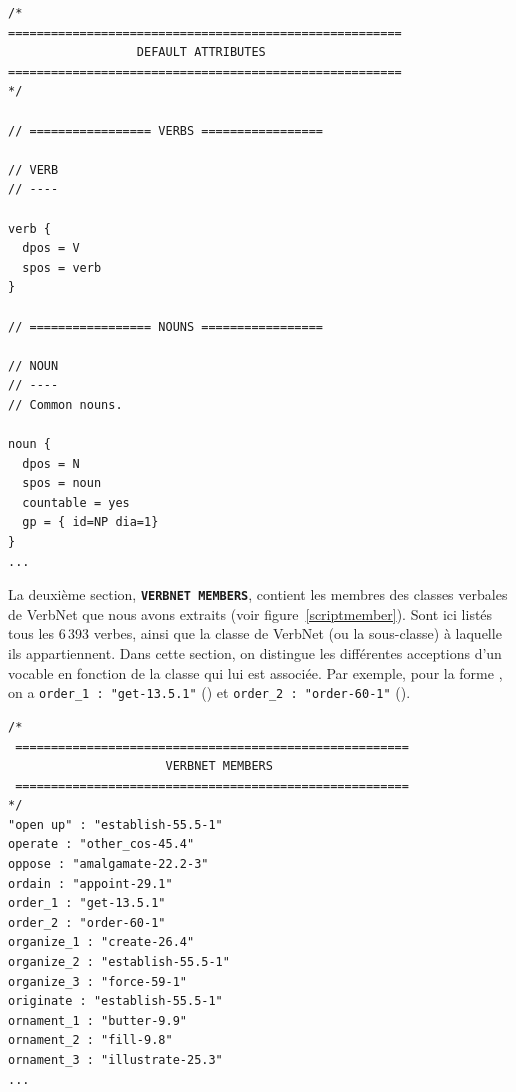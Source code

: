 
\begin{lstlisting}[language=mate, caption = Extrait du \emph{lexicon}: attributs par défaut des classes génériques, label=classedef]
/*
=======================================================
                  DEFAULT ATTRIBUTES
=======================================================
*/

// ================= VERBS =================

// VERB
// ----

verb {
  dpos = V
  spos = verb
}

// ================= NOUNS =================

// NOUN
// ----
// Common nouns.

noun {
  dpos = N
  spos = noun
  countable = yes
  gp = { id=NP dia=1}
}
...
\end{lstlisting}

La deuxième section, \textbf{\texttt{VERBNET MEMBERS}}, contient les membres des classes verbales de VerbNet que nous avons extraits (voir figure~\ref{scriptmember}). Sont ici listés tous les 6\,393 verbes, ainsi que la classe de VerbNet (ou la sous-classe) à laquelle ils appartiennent. Dans cette section, on distingue les différentes acceptions d'un vocable en fonction de la classe qui lui est associée. Par exemple, pour la forme , on a \texttt{order\_1 : "get-13.5.1"} () et \texttt{order\_2 : "order-60-1"} ().

\begin{lstlisting}[language=mate, caption = Extrait du \emph{lexicon}: unités lexicales verbales]
/*
 =======================================================
                      VERBNET MEMBERS
 =======================================================
*/
"open up" : "establish-55.5-1"
operate : "other_cos-45.4"
oppose : "amalgamate-22.2-3"
ordain : "appoint-29.1"
order_1 : "get-13.5.1"
order_2 : "order-60-1"
organize_1 : "create-26.4"
organize_2 : "establish-55.5-1"
organize_3 : "force-59-1"
originate : "establish-55.5-1"
ornament_1 : "butter-9.9"
ornament_2 : "fill-9.8"
ornament_3 : "illustrate-25.3"
...
\end{lstlisting}

